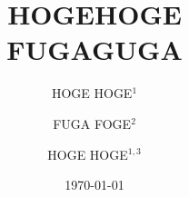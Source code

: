 \title{HOGEHOGE \\
FUGAGUGA}

\author{HOGE HOGE$^{1}$ }
\author{FUGA FOGE$^{2}$ }
\author{HOGE HOGE$^{1,3}$ }

\date{\today}
